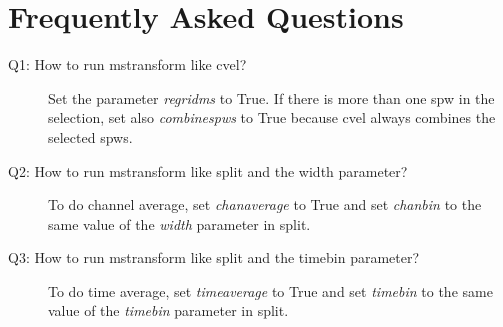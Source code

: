 \section{Frequently Asked Questions}\label{Sec:FAQ}
\begin{description}
  \item[Q1: How to run mstransform like cvel?] \hfill 
  Set the parameter {\it regridms} to True. If there is more than one spw in the
selection, set also {\it combinespws} to True because cvel always combines the selected
spws.

  \item[Q2: How to run mstransform like split and the width parameter?] \hfill 
  To do channel average, set {\it chanaverage} to True and set {\it chanbin} to
  the same value of the {\it width} parameter in split.

  \item[Q3: How to run mstransform like split and the timebin parameter?] \hfill 
  To do time average, set {\it timeaverage} to True and set {\it timebin} to
  the same value of the {\it timebin} parameter in split.
\item[]
\end{description}

